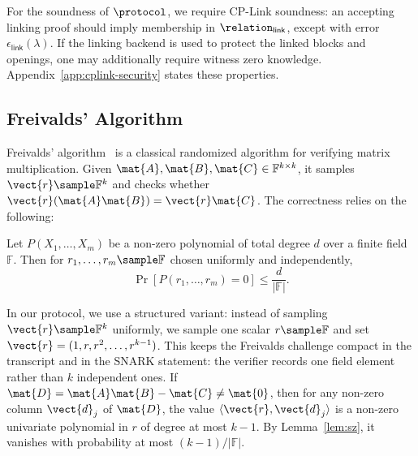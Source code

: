 \begin{remark}
For the soundness of \(\protocol\), we require CP-Link soundness: an accepting
linking proof should imply membership in \(\relation_{\mathsf{link}}\), except
with error \(\epsilon_{\mathsf{link}}(\lambda)\).  If the linking backend is used
to protect the linked blocks and openings, one may additionally require witness
zero knowledge.  Appendix~\ref{app:cplink-security} states these properties.
\end{remark}

\subsection{Freivalds' Algorithm}
\label{sec:prelim-freivalds}

Freivalds' algorithm~\cite{freivalds1977probabilistic} is a classical randomized algorithm for verifying matrix multiplication.
Given $\mat{A}, \mat{B}, \mat{C} \in \mathbb{F}^{k \times k}$, it samples $\vect{r} \sample \mathbb{F}^k$ and checks whether $\vect{r}(\mat{A}\mat{B}) = \vect{r}\mat{C}$.
The correctness relies on the following:

\begin{lemma}\label{lem:sz}
Let $P(X_1, \ldots, X_m)$ be a non-zero polynomial of total degree $d$ over a finite field $\mathbb{F}$.
Then for $r_1, \ldots, r_m \sample \mathbb{F}$ chosen uniformly and independently,
\[
\Pr[P(r_1, \ldots, r_m) = 0] \le \frac{d}{|\mathbb{F}|}.
\]
\end{lemma}

In our protocol, we use a structured variant: instead of sampling $\vect{r} \sample \mathbb{F}^k$ uniformly, we sample one scalar $r \sample \mathbb{F}$ and set $\vect{r} = (1, r, r^2, \ldots, r^{k-1})$.
This keeps the Freivalds challenge compact in the transcript and in the SNARK
statement: the verifier records one field element rather than $k$ independent
ones. If $\mat{D} = \mat{A}\mat{B} - \mat{C} \neq \mat{0}$, then for any non-zero
column $\vect{d}_j$ of $\mat{D}$, the value $\langle \vect{r}, \vect{d}_j \rangle$ is a non-zero univariate polynomial in
$r$ of degree at most $k-1$.
By Lemma~\ref{lem:sz}, it vanishes with probability at most $(k-1)/|\mathbb{F}|$.
